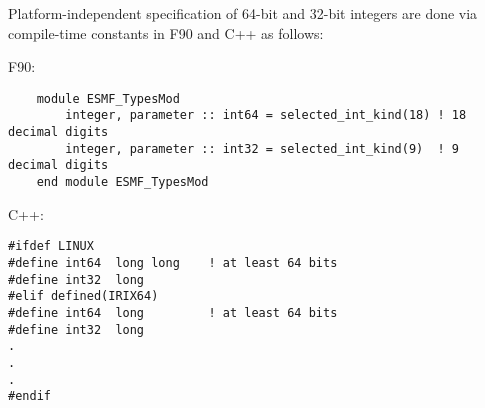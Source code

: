 
Platform-independent specification of 64-bit and 32-bit integers are done via
compile-time constants in F90 and C++ as follows:

F90:
\begin{verbatim}
    module ESMF_TypesMod
        integer, parameter :: int64 = selected_int_kind(18) ! 18 decimal digits
        integer, parameter :: int32 = selected_int_kind(9)  ! 9  decimal digits
    end module ESMF_TypesMod
\end{verbatim}

C++:
\begin{verbatim}
#ifdef LINUX
#define int64  long long	! at least 64 bits
#define int32  long
#elif defined(IRIX64)
#define int64  long			! at least 64 bits
#define int32  long
.
.
.
#endif
\end{verbatim}
